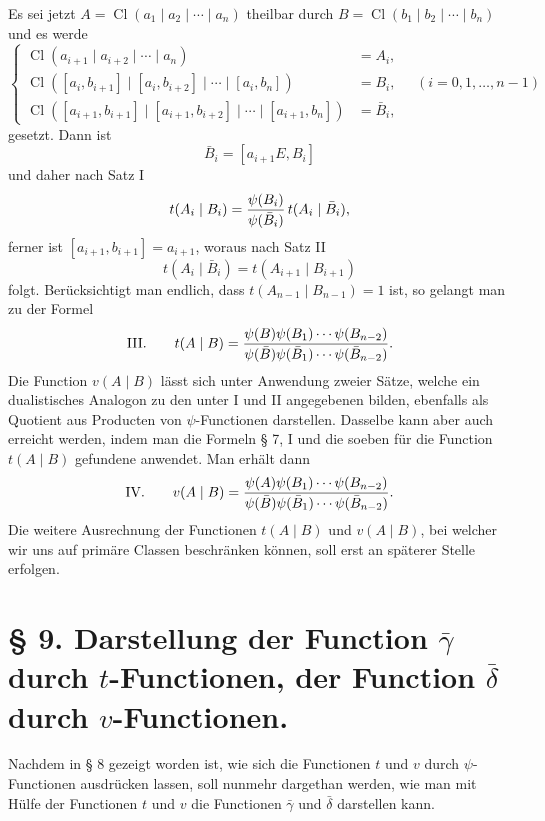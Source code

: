 \documentclass[11pt,a4paper]{article}
\newcommand{\Cl}{\operatorname{Cl}}
\begin{document}
Es sei jetzt $A=\Cl(a_1\mid a_2\mid\cdots\mid a_n)$ theilbar durch $B=\Cl(b_1\mid b_2\mid\cdots\mid b_n)$ und es werde
\begin{equation}
\left\{
\begin{aligned}
 \Cl(a_{i+1}\mid a_{i+2}\mid\cdots\mid a_n)&=A_i,\\
 \Cl([a_i,b_{i+1}]\mid[a_i,b_{i+2}]\mid\cdots\mid[a_i,b_n])&=B_i,\\
 \Cl([a_{i+1},b_{i+1}]\mid[a_{i+1},b_{i+2}]\mid\cdots\mid[a_{i+1},b_n])&=\bar B_i,
\end{aligned}
\right.
\quad (i=0,1,\ldots,n-1)
\tag{5}
\end{equation}
gesetzt. Dann ist
\[
 \bar B_i=[a_{i+1}E,B_i]
\]
und daher nach Satz I
\[
 t(A_i\mid B_i)={\psi(B_i)\over\psi(\bar B_i)}\,t(A_i\mid\bar B_i),
\]
ferner ist $[a_{i+1},b_{i+1}]=a_{i+1}$, woraus nach Satz II
\[
 t(A_i\mid\bar B_i)=t(A_{i+1}\mid B_{i+1})
\]
folgt. Berücksichtigt man endlich, dass $t(A_{n-1}\mid B_{n-1})=1$ ist, so gelangt man zu der Formel
\[
\text{III.}\qquad
 t(A\mid B)=
 {\psi(B)\psi(B_1)\cdots\psi(B_{n-2})
 \over
 \psi(\bar B)\psi(\bar B_1)\cdots\psi(\bar B_{n-2})}.
\]
Die Function $v(A\mid B)$ lässt sich unter Anwendung zweier Sätze, welche ein dualistisches Analogon zu den unter I und II angegebenen bilden, ebenfalls als Quotient aus Producten von $\psi$-Functionen darstellen. Dasselbe kann aber auch erreicht werden, indem man die Formeln § 7, I und die soeben für die Function $t(A\mid B)$ gefundene anwendet. Man erhält dann
\[
\text{IV.}\qquad
 v(A\mid B)=
 {\psi(A)\psi(B_1)\cdots\psi(B_{n-2})
 \over
 \psi(\bar B)\psi(\bar B_1)\cdots\psi(\bar B_{n-2})}.
\]
Die weitere Ausrechnung der Functionen $t(A\mid B)$ und $v(A\mid B)$, bei welcher wir uns auf primäre Classen beschränken können, soll erst an späterer Stelle erfolgen.

\section*{§ 9. Darstellung der Function $\bar\gamma$ durch $t$-Functionen, der Function $\bar\delta$ durch $v$-Functionen.}

Nachdem in § 8 gezeigt worden ist, wie sich die Functionen $t$ und $v$ durch $\psi$-Functionen ausdrücken lassen, soll nunmehr dargethan werden, wie man mit Hülfe der Functionen $t$ und $v$ die Functionen $\bar\gamma$ und $\bar\delta$ darstellen kann.
\end{document}
